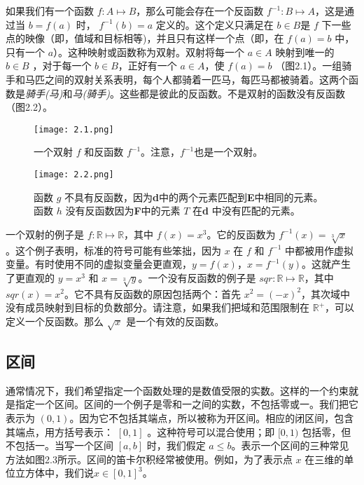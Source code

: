 \documentclass[lang=cn,12pt]{elegantbook}
\begin{document}
如果我们有一个函数 $f : A \mapsto B$，那么可能会存在一个反函数 $f^{-1} : B \mapsto A$，这是通过当 $b = f(a)$ 时， $f^{-1}(b) = a$ 定义的。这个定义只满足在 $b \in B$是 $f$ 下一些点的映像（即，值域和目标相等)，并且只有这样一个点（即，在 $f(a) = b$ 中，只有一个 $a$）。这种映射或函数称为双射。双射将每一个 $a \in A$ 映射到唯一的 $b \in B$ ，对于每一个 $b \in B$，正好有一个 $a \in A$，使 $f(a)=b$ （图2.1）。一组骑手和马匹之间的双射关系表明，每个人都骑着一匹马，每匹马都被骑着。这两个函数是\textit{骑手(马)}和\textit{马(骑手)}。这些都是彼此的反函数。不是双射的函数没有反函数（图2.2）。

\begin{figure}[htb]
\centering
\begin{minipage}[t]{0.45\textwidth}
\centering
\texttt{[image: 2.1.png]}
\caption{一个双射 $f$ 和反函数 $f^{-1}$。注意，$f^{-1}$也是一个双射。}
\end{minipage}
\begin{minipage}[t]{0.45\textwidth}
\centering
\texttt{[image: 2.2.png]}
\caption{函数 $g$ 不具有反函数，因为\textbf{d}中的两个元素匹配到\textbf{E}中相同的元素。函数 $h$ 没有反函数因为\textbf{F}中的元素 $T$ 在\textbf{d} 中没有匹配的元素。}
\end{minipage}
\end{figure}

一个双射的例子是 $f : \mathbb{R} \mapsto \mathbb{R}$，其中 $f(x) = x^3$。它的反函数为 $f^{-1}(x) = \sqrt[3]{x}$ 。这个例子表明，标准的符号可能有些笨拙，因为 $x$ 在 $f$ 和 $f^{-1}$ 中都被用作虚拟变量。有时使用不同的虚拟变量会更直观，$y = f(x)$，$x=f^{-1}(y)$。这就产生了更直观的 $y = x^3$ 和 $x = \sqrt[3]{y}$。一个没有反函数的例子是 $sqr : \mathbb{R} \mapsto \mathbb{R}$，其中 $sqr(x) = x^2$。它不具有反函数的原因包括两个：首先 $x^2 = (-x)^2$，其次域中没有成员映射到目标的负数部分。请注意，如果我们把域和范围限制在 $\mathbb{R^+}$，可以定义一个反函数。那么 $\sqrt{x}$ 是一个有效的反函数。

\subsection{区间}

通常情况下，我们希望指定一个函数处理的是数值受限的实数。这样的一个约束就是指定一个区间。区间的一个例子是零和一之间的实数，不包括零或一。我们把它表示为 $(0,1)$。因为它不包括其端点，所以被称为开区间。相应的闭区间，包含其端点，用方括号表示： $[ 0 , 1 ]$ 。这种符号可以混合使用；即 $[0,1)$ 包括零，但不包括一。当写一个区间 $[a,b]$ 时，我们假定 $a \leq b$。表示一个区间的三种常见方法如图2.3所示。区间的笛卡尔积经常被使用。例如，为了表示点 $x$ 在三维的单位立方体中，我们说$x \in [0, 1]^3$。
\end{document}
